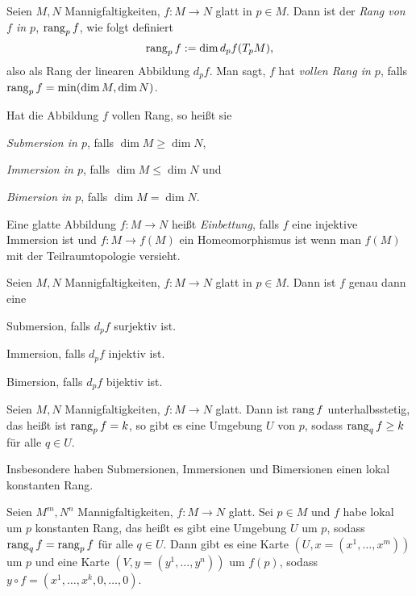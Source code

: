 \begin{definition}
  Seien $M,N$ Mannigfaltigkeiten, $f\colon M \to N$ glatt in $p\in
  M$. Dann ist der \emph{Rang von $f$ in $p$}, $\operatorname{rang}_p f$, wie folgt definiert
  \begin{equation*}
    \operatorname{rang}_p f := \dim d_pf(T_pM),
  \end{equation*}
  also als Rang der linearen Abbildung $d_pf$. Man sagt, $f$ hat
  \emph{vollen Rang in $p$}, falls $\operatorname{rang}_p f = \min(\dim M,\dim N)$.

  Hat die Abbildung $f$ vollen Rang, so heißt sie
  \begin{statements}
  \item \emph{Submersion in $p$}, falls  $\dim M \geq \dim N$,
  \item \emph{Immersion in $p$}, falls $\dim M \leq \dim N$ und
  \item \emph{Bimersion in $p$}, falls $\dim M = \dim N$.
  \end{statements}

  Eine glatte Abbildung $f\colon M \to N$ heißt \emph{Einbettung},
  falls $f$ eine injektive Immersion ist und $f\colon M \to f(M)$ ein
  Homeomorphismus ist wenn man $f(M)$ mit der Teilraumtopologie versieht.
\end{definition}

\begin{proposition}
  Seien $M,N$ Mannigfaltigkeiten, $f\colon M \to N$ glatt in $p\in
  M$. Dann ist $f$ genau dann eine
  \begin{statements}
  \item Submersion, falls $d_pf$ surjektiv ist.
  \item Immersion, falls $d_pf$ injektiv ist.
  \item Bimersion, falls $d_pf$ bijektiv ist.
  \end{statements}
\end{proposition}

\begin{proposition}
  Seien $M,N$ Mannigfaltigkeiten, $f\colon M \to N$ glatt. Dann ist
  $\operatorname{rang} f$ unterhalbsstetig, das heißt ist $\operatorname{rang}_p f = k$, so gibt es
  eine Umgebung $U$ von $p$, sodass $\operatorname{rang}_q f \geq k$ für alle $q\in
  U$.

  Insbesondere haben Submersionen, Immersionen und Bimersionen einen
  lokal konstanten Rang.
\end{proposition}

\begin{satz}
  Seien $M^m,N^n$ Mannigfaltigkeiten, $f\colon M \to N$ glatt. Sei $p\in
  M$ und $f$ habe lokal um $p$ konstanten Rang, das heißt es gibt eine
  Umgebung $U$ um $p$, sodass $\operatorname{rang}_qf = \operatorname{rang}_pf$ für alle $q\in
  U$. Dann gibt es eine Karte $(U,x=(x^1,\dots,x^m))$ um $p$ und eine
  Karte $(V,y=(y^1,\dots,y^n))$ um $f(p)$, sodass $y\circ f = (x^1,\dots,x^k,0,\dots,0)$.
\end{satz}

